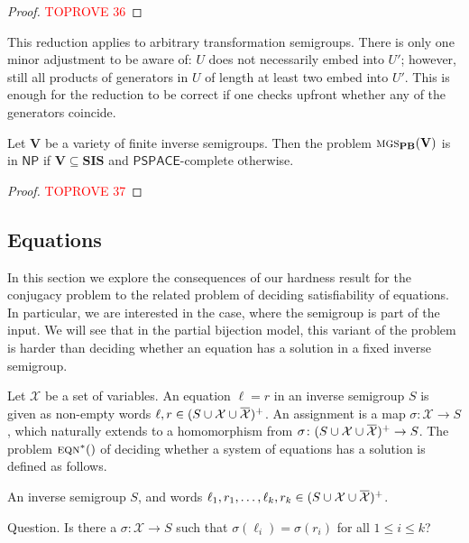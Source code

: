 \documentclass[anonymous,letter,UKenglish,cleveref,autoref,thm-restate]{lipics-v2021}
\makeatletter
\renewcommand{\leq}{\leqslant}
\renewcommand{\le}{\leq}
\newcommand{\sse}{\subseteq}
\newcommand{\NP}{\ensuremath{\mathsf{NP}}\xspace}
\newcommand{\PSPACE}{\ensuremath{\mathsf{PSPACE}}\xspace}
\newcommand{\vV}{\ensuremath{\mathbf{V}}}
\newcommand{\vSI}{\ensuremath{\mathbf{SIS}}}
\newcommand\nindent{.5pt}
\newcommand\noverline[1]{\kern\nindent\overline{\kern-\nindent#1\kern-\nindent}\kern\nindent}
\newcommand{\ov}[1]{\noverline{#1}}
\newcommand{\cX}{\mathcal{X}}
\theoremstyle{plain}
\theoremstyle{plain}
\providecommand\iitem{}
\providecommand\qitem{}
\newcommand\decproblem@iitem@label{\rlap{Input.}\phantom{Question.}}
\newcommand\decproblem@qitem@label{Question.}
\newenvironment{decproblem}{\begin{description}\begin{samepage}\renewcommand{\iitem}{\item[\decproblem@iitem@label]}\renewcommand{\qitem}{\item[\decproblem@qitem@label]}}{\end{samepage}\end{description}}
\newcommand{\dMGS}[2][]{\textup{\textsc{mgs${}_{\mathbf{#1}}\expandafter\ifx\expandafter\relax\detokenize{#2}\relax\else(#2)\fi$}}}
\newcommand{\dEqnSys}[2][]{\textup{\textsc{eqn${}^\ast_{\mathbf{#1}}\expandafter\ifx\expandafter\relax\detokenize{#2}\relax\else(#2)\fi$}}}
\makeatother
\begin{document}
\begin{proof}\textcolor{red}{TOPROVE 36}\end{proof}


\begin{remark}
	This reduction applies to arbitrary transformation semigroups.
	There is only one minor adjustment to be aware of: $U$ does not necessarily embed into $U'$; however, still all products of generators in $U$ of length at least two embed into $U'$.
  This is enough for the reduction to be correct if one checks upfront whether any of the generators coincide.
\end{remark}



\begin{corollary}
	Let $\vV$ be a variety of finite inverse semigroups. 
  Then the problem $\dMGS[PB]{\vV}$ is in \NP if $\vV\sse \vSI$ and \PSPACE-complete otherwise.
\end{corollary}
\begin{proof}\textcolor{red}{TOPROVE 37}\end{proof}

\subsection{Equations}

In this section we explore the consequences of our hardness result for the conjugacy problem to the related problem of deciding satisfiability of equations.
In particular, we are interested in the case, where the semigroup is part of the input.
We will see that in the partial bijection model, this variant of the problem is harder than deciding whether an equation has a solution in a fixed inverse semigroup.

Let $\cX$ be a set of variables.
An equation $\ell = r$ in an inverse semigroup $S$ is given as non-empty words $\ell, r \in (S \cup \cX \cup \ov \cX)^+$.
An assignment is a map $\sigma\colon \cX \to S$, which naturally extends to a homomorphism from $\sigma\colon (S \cup \cX \cup \ov \cX)^+ \to S$.
The problem $\dEqnSys{}$ of deciding whether a system of equations has a solution is defined as follows.

\begin{decproblem}
	\iitem An inverse semigroup $S$, and words $\ell_1, r_1, \ldots, \ell_k, r_k \in (S \cup \cX \cup \ov \cX)^+$.
	\qitem Is there a $\sigma\colon \cX \to S$ such that $\sigma(\ell_i) = \sigma(r_i)$ for all $1 \le i \le k$?
\end{decproblem}
\end{document}
